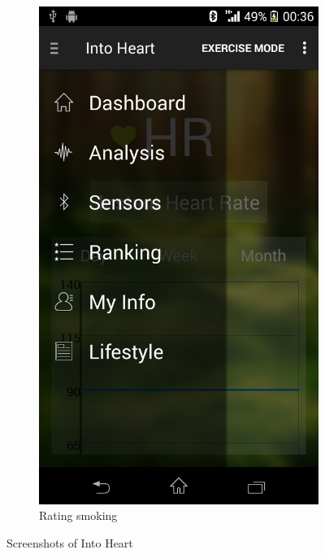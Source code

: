 \begin{figure}
\begin{subfigure}{.24\textwidth}
  \includegraphics[width=.8\linewidth]{img/screenshot/ss11.png}
  \caption{Rating smoking}
\end{subfigure}
\caption{Screenshots of Into Heart}
\label{fig:ss}
\end{figure}